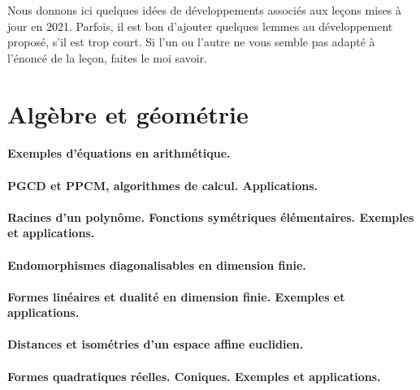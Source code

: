
Nous donnons ici quelques idées de développements associés aux leçons mises à jour en 2021. Parfois, il est bon d'ajouter quelques lemmes au développement proposé, s'il est trop court. Si l'un ou l'autre ne vous semble pas adapté à l'énoncé de la leçon, faites le moi savoir.

\section{Algèbre et géométrie}

\paragraph{Exemples d'équations en arithmétique.}
\paragraph{PGCD et PPCM, algorithmes de calcul. Applications.}
\paragraph{Racines d'un polynôme. Fonctions symétriques élémentaires. Exemples et applications.}
\paragraph{Endomorphismes diagonalisables en dimension finie.}
\paragraph{Formes linéaires et dualité en dimension finie. Exemples et applications.}
\paragraph{Distances et isométries d'un espace affine euclidien.}
\paragraph{Formes quadratiques réelles. Coniques. Exemples et applications.}
